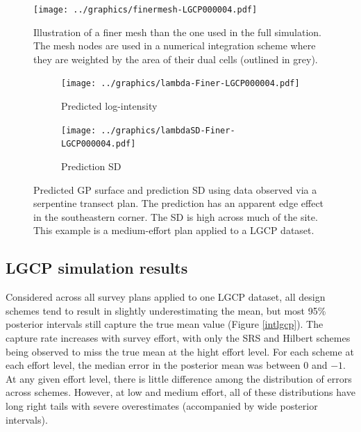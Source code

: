 \documentclass[review]{elsarticle}
\begin{document}
\begin{figure}
\texttt{[image: ../graphics/finermesh-LGCP000004.pdf]}
\caption{Illustration of a finer mesh than the one used in the full simulation.
The mesh nodes are used in a numerical integration scheme where they are
weighted by the area of their dual cells (outlined in grey).}
\label{meshfiner}
\end{figure}

\begin{figure}

\begin{subfigure}{5in}
\texttt{[image: ../graphics/lambda-Finer-LGCP000004.pdf]}
\caption{Predicted log-intensity}
\label{lambdafinerlgcp}
\end{subfigure}

\begin{subfigure}{5in}
\texttt{[image: ../graphics/lambdaSD-Finer-LGCP000004.pdf]}
\caption{Prediction SD}
\label{sdfinerlgcp}
\end{subfigure}

\caption{Predicted GP surface and prediction SD using data observed via a
serpentine transect plan. The prediction has an apparent edge effect in the
southeastern corner. The SD is high across much of the site. This example is
a medium-effort plan applied to a LGCP dataset.}
\label{finer}
\end{figure}


\subsection{LGCP simulation results}

Considered across all survey plans applied to one LGCP dataset, all design
schemes tend to result in slightly underestimating the mean, but most
95\% posterior intervals still capture the true mean value (Figure
\ref{intlgcp}). The capture rate increases with survey effort, with only
the SRS and Hilbert schemes being observed to miss the true mean at the
hight effort level. For each scheme at each effort level, the median
error in the posterior mean was between 0 and \(-1\). At any given effort
level, there is little difference among the distribution of errors across
schemes. However, at low and medium effort, all of these distributions
have long right tails with severe overestimates (accompanied by wide
posterior intervals).
\end{document}
